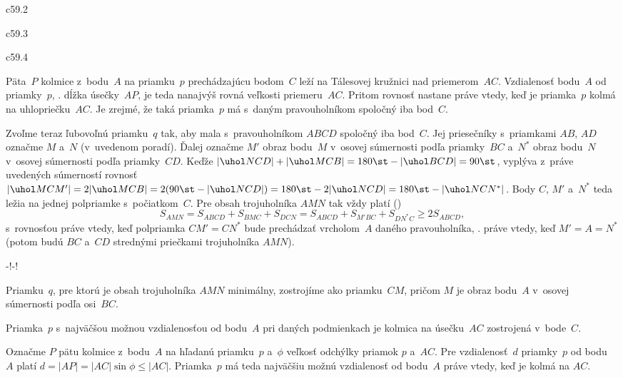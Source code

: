{%
\epsplace c59.2 \par
\epsplace c59.3 \par
\ifrocenka\else\epsplace c59.4 \hfil\Obr\par\fi
Päta~$P$ kolmice z~bodu~$A$ na priamku~$p$ prechádzajúcu bodom~$C$ leží na Tálesovej kružnici nad priemerom~$AC$.
Vzdialenosť bodu~$A$ od priamky~$p$, \tj. dĺžka úsečky~$AP$, je teda nanajvýš rovná veľkosti priemeru~$AC$.
Pritom rovnosť nastane práve vtedy, keď je priamka~$p$ kolmá na uhlopriečku~$AC$. Je zrejmé, že
taká priamka~$p$ má s~daným pravouholníkom spoločný iba bod~$C$.

Zvoľme teraz ľubovoľnú priamku~$q$ tak, aby mala s~pravouholníkom $ABCD$ spoločný iba bod~$C$.
Jej priesečníky s~priamkami $AB$, $AD$ označme $M$ a~$N$ (v~uvedenom poradí). Ďalej označme $M'$ obraz
bodu~$M$ v~osovej súmernosti podľa priamky~$BC$ a~$N^*$ obraz bodu~$N$ v~osovej súmernosti podľa priamky~$CD$.
Keďže $|\uhol NCD|+|\uhol MCB|=180\st-|\uhol BCD|=90\st$, vyplýva z~práve uvedených súmerností
rovnosť $|\uhol MCM'|=2|\uhol MCB|=2({90\st-|\uhol NCD|})=180\st-2|\uhol NCD|=180\st-|\uhol NCN^*|$.
Body $C$, $M'$ a~$N^*$ teda ležia na jednej polpriamke s~počiatkom~$C$.
Pre obsah trojuholníka $AMN$ tak vždy platí (\obr)
$$
S_{AMN} =S_{ABCD} +S_{BMC} +S_{DCN} =S_{ABCD} +S_{M'BC} +S_{DN^*C} \ge 2S_{ABCD},
$$
s~rovnosťou práve vtedy, keď polpriamka $CM'=CN^*$ bude prechádzať vrcholom~$A$ daného
pravouholníka, \tj. práve vtedy, keď $M'=A=N^*$ (potom budú $BC$ a~$CD$ strednými priečkami
trojuholníka $AMN$).

\medskip
\centerline{\inspicture-!\hss\inspicture-!}
\nobreak\centerline\Obr
\medskip


\zaver
Priamku~$q$, pre ktorú je obsah trojuholníka $AMN$ minimálny, zostrojíme ako priamku~$CM$, pričom $M$ je obraz bodu~$A$ v~osovej súmernosti podľa osi~$BC$.

Priamka~$p$ s~najväčšou možnou vzdialenosťou od bodu~$A$ pri daných podmienkach je kolmica na úsečku~$AC$ zostrojená v~bode~$C$.



\ineriesenie
Označme $P$ pätu kolmice z~bodu~$A$ na hľadanú priamku~$p$ a~$\phi$ veľkosť odchýlky
priamok $p$ a~$AC$. Pre vzdialenosť~$d$ priamky~$p$ od bodu~$A$ platí $d=|AP|=|AC|\sin\phi\le|AC|$.
Priamka~$p$ má teda najväčšiu možnú vzdialenosť od bodu~$A$ práve vtedy, keď je kolmá na $AC$.

}
